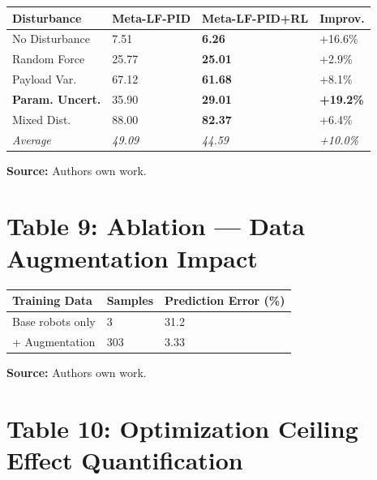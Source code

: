 \documentclass[11pt,a4paper]{article}
\begin{document}
\begin{tabular}{@{\extracolsep{\fill}}llll}
\hline
\textbf{Disturbance} & \textbf{Meta-LF-PID} & \textbf{Meta-LF-PID+RL} & \textbf{Improv.} \\
\hline
No Disturbance & 7.51 & \textbf{6.26} & +16.6\% \\
Random Force & 25.77 & \textbf{25.01} & +2.9\% \\
Payload Var. & 67.12 & \textbf{61.68} & +8.1\% \\
\textbf{Param. Uncert.} & 35.90 & \textbf{29.01} & \textbf{+19.2\%} \\
Mixed Dist. & 88.00 & \textbf{82.37} & +6.4\% \\
\hline
\textit{Average} & \textit{49.09} & \textit{44.59} & \textit{+10.0\%} \\
\hline
\end{tabular}

\vspace{0.2cm}
\noindent
\textbf{Source:} Authors own work.


\section*{Table 9: Ablation --- Data Augmentation Impact}

\begin{tabular}{@{\extracolsep{\fill}}lll}
\hline
\textbf{Training Data} & \textbf{Samples} & \textbf{Prediction Error (\%)} \\
\hline
Base robots only & 3 & 31.2 \\
+ Augmentation & 303 & 3.33 \\
\hline
\end{tabular}

\vspace{0.2cm}
\noindent
\textbf{Source:} Authors own work.


\section*{Table 10: Optimization Ceiling Effect Quantification}
\end{document}
